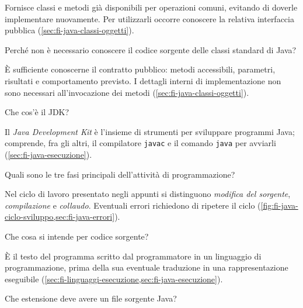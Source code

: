 Fornisce classi e metodi già disponibili per operazioni comuni, evitando di
doverle implementare nuovamente. Per utilizzarli occorre conoscere la relativa
interfaccia pubblica (\cref{sec:fi-java-classi-oggetti}).

\begin{exercise}
\label{ex:fi-esercizi-introduzione-java-sorgente-libreria}
Perché non è necessario conoscere il codice sorgente delle classi standard di Java?
\end{exercise}

È sufficiente conoscerne il contratto pubblico: metodi accessibili, parametri,
risultati e comportamento previsto. I dettagli interni di implementazione non
sono necessari all'invocazione dei metodi
(\cref{sec:fi-java-classi-oggetti}).

\begin{exercise}
\label{ex:fi-esercizi-introduzione-java-jdk}
Che cos'è il JDK?
\end{exercise}

Il \emph{Java Development Kit} è l'insieme di strumenti per sviluppare programmi
Java; comprende, fra gli altri, il compilatore \texttt{javac} e il comando
\texttt{java} per avviarli (\cref{sec:fi-java-esecuzione}).

\begin{exercise}
\label{ex:fi-esercizi-introduzione-java-fasi-programmazione}
Quali sono le tre fasi principali dell'attività di programmazione?
\end{exercise}

Nel ciclo di lavoro presentato negli appunti si distinguono \emph{modifica del
sorgente}, \emph{compilazione} e \emph{collaudo}. Eventuali errori richiedono di
ripetere il ciclo (\cref{fig:fi-java-ciclo-sviluppo,sec:fi-java-errori}).

\begin{exercise}
\label{ex:fi-esercizi-introduzione-java-codice-sorgente}
Che cosa si intende per codice sorgente?
\end{exercise}

È il testo del programma scritto dal programmatore in un linguaggio di
programmazione, prima della sua eventuale traduzione in una rappresentazione
eseguibile (\cref{sec:fi-linguaggi-esecuzione,sec:fi-java-esecuzione}).

\begin{exercise}
\label{ex:fi-esercizi-introduzione-java-estensione-java}
Che estensione deve avere un file sorgente Java?
\end{exercise}

